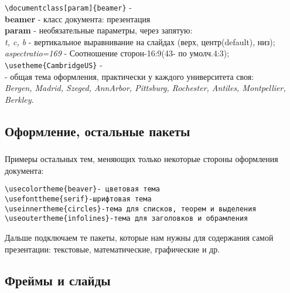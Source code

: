 \documentclass[aspectratio=169,
]{beamer}
\begin{document}
\begin{frame}[fragile, label=f2]%
\frametitle{\insertsection}
\framesubtitle{\insertsubsection}

\verb|\documentclass[param]{beamer}| - \\
\textbf{beamer} - класс документа: презентация \\
\textbf{param} - необязательные параметры, через запятую: \\
\textit{t, c,  b} - вертикальное выравнивание на слайдах (верх, центр(default), низ);\\
\textit{aspectratio=169} - Соотношение сторон-16:9(43- по умолч.4:3); \\ \medskip
\verb|\usetheme{CambridgeUS}| - \\
- общая тема оформления, практически у каждого университета своя: \\
\textit{Bergen, Madrid, Szeged, AnnArbor, Pittsburg, Rochester, Antiles, Montpellier, Berkley.}
\end{frame}


\subsection{Оформление, остальные пакеты}

\begin{frame}[fragile, label=f3]
\frametitle{\insertsection}
\framesubtitle{\insertsubsection}

Примеры остальных тем, меняющих только некоторые стороны оформления документа:
\begin{verbatim}
\usecolortheme{beaver}- цветовая тема
\usefonttheme{serif}-шрифтовая тема
\useinnertheme{circles}-тема для списков, теорем и выделения
\useoutertheme{infolines}-тема для заголовков и обрамления
\end{verbatim}
Дальше подключаем те пакеты, которые нам нужны для содержания самой презентации:
текстовые, математические, графические и др.
\end{frame}



\subsection{Фреймы и слайды}
\end{document}
